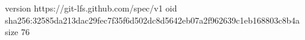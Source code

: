 version https://git-lfs.github.com/spec/v1
oid sha256:32585da213dac29fec7f35f6d502dc8d5642eb07a2f962639c1eb168803c8b4a
size 76
